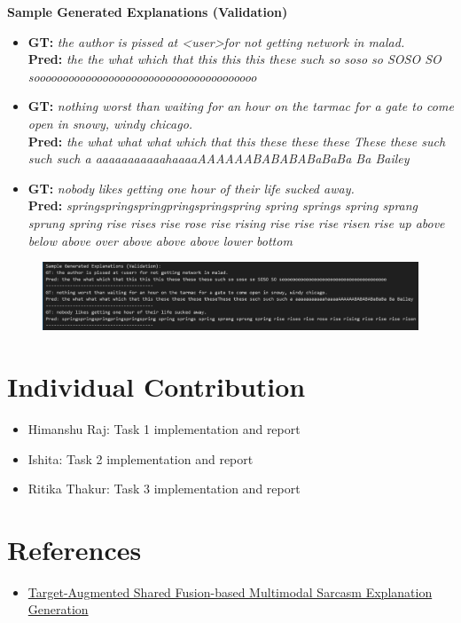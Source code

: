 \documentclass{article}
\begin{document}
\vspace{5mm}
\textbf{Sample Generated Explanations (Validation)}\\[3mm]
\begin{itemize}
    \item \textbf{GT:} \textit{the author is pissed at \textless user\textgreater for not getting network in malad.}\\
    \textbf{Pred:} \textit{the the what which that this this this these such so soso so SOSO SO sooooooooooooooooooooooooooooooooooooooo}
    \item \textbf{GT:} \textit{nothing worst than waiting for an hour on the tarmac for a gate to come open in snowy, windy chicago.}\\
    \textbf{Pred:} \textit{the what what what which that this these these these These these such such such a aaaaaaaaaaahaaaaAAAAAABABABABaBaBa Ba Bailey}
    \item \textbf{GT:} \textit{nobody likes getting one hour of their life sucked away.}\\
    \textbf{Pred:} \textit{springspringspringpringspringspring spring springs spring sprang sprung spring rise rises rise rose rise rising rise rise rise risen rise up above below above over above above above lower bottom}
\end{itemize}
\begin{figure}[H]
    \centering
    \includegraphics[width=0.8\linewidth]{image.png}
\end{figure}

\section{Individual Contribution}
\begin{itemize}
    \item Himanshu Raj: Task 1 implementation and report
    \item Ishita: Task 2 implementation and report
    \item Ritika Thakur: Task 3 implementation and report
\end{itemize}

\section{References}
\begin{itemize}
    \item \hyperlink{https://drive.google.com/file/d/1mMX4NhoZovPh8pJNbMpmV_EWy43CoBPO/view}{Target-Augmented Shared Fusion-based Multimodal Sarcasm Explanation Generation}
\end{itemize}
\end{document}
